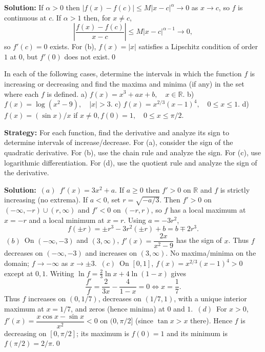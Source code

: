 \bigskip\noindent\textbf{Solution:}
If $\alpha>0$ then $|f(x)-f(c)|\le M|x-c|^{\alpha}\to 0$ as $x\to c$, so $f$ is continuous at $c$. If $\alpha>1$ then, for $x\ne c$,
\[\left|\frac{f(x)-f(c)}{x-c}\right|\le M|x-c|^{\alpha-1}\to 0,\]
so $f'(c)=0$ exists. For (b), $f(x)=|x|$ satisfies a Lipschitz condition of order $1$ at $0$, but $f'(0)$ does not exist.\qed


\begin{problembox}
In each of the following cases, determine the intervals in which the function \( f \) is increasing or decreasing and find the maxima and minima (if any) in the set where each \( f \) is defined.
a) \( f(x) = x^3 + ax + b, \quad x \in \mathbb{R} \).
b) \( f(x) = \log (x^2 - 9), \quad |x| > 3 \).
c) \( f(x) = x^{2/3}(x - 1)^4, \quad 0 \leq x \leq 1 \).
d) \( f(x) = (\sin x)/x \) if \( x \neq 0, f(0) = 1, \quad 0 \leq x \leq \pi /2 \).
\end{problembox}

\noindent\textbf{Strategy:} For each function, find the derivative and analyze its sign to determine intervals of increase/decrease. For (a), consider the sign of the quadratic derivative. For (b), use the chain rule and analyze the sign. For (c), use logarithmic differentiation. For (d), use the quotient rule and analyze the sign of the derivative.

\bigskip\noindent\textbf{Solution:}
\(\,(a)\,\) $f'(x)=3x^2+a$. If $a\ge 0$ then $f'>0$ on $\mathbb{R}$ and $f$ is strictly increasing (no extrema). If $a<0$, set $r=\sqrt{-a/3}$. Then $f'>0$ on $(-\infty,-r)\cup(r,\infty)$ and $f'<0$ on $(-r,r)$, so $f$ has a local maximum at $x=-r$ and a local minimum at $x=r$. Using $a=-3r^2$,
\[f(\pm r)=\pm r^3-3r^2(\pm r)+b=b\mp 2r^3.\]
\(\,(b)\,\) On $(-\infty,-3)$ and $(3,\infty)$, $f'(x)=\dfrac{2x}{x^2-9}$ has the sign of $x$. Thus $f$ decreases on $(-\infty,-3)$ and increases on $(3,\infty)$. No maxima/minima on the domain; $f\to-\infty$ as $x\to\pm3$.\newline
\(\,(c)\,\) On $[0,1]$, $f(x)=x^{2/3}(x-1)^4>0$ except at $0,1$. Writing $\ln f=\tfrac23\ln x+4\ln(1-x)$ gives
\[\frac{f'}{f}=\frac{2}{3x}-\frac{4}{1-x}=0\iff x=\frac17.\]
Thus $f$ increases on $(0,1/7)$, decreases on $(1/7,1)$, with a unique interior maximum at $x=1/7$, and zeros (hence minima) at $0$ and $1$.\newline
\(\,(d)\,\) For $x>0$, $f'(x)=\dfrac{x\cos x-\sin x}{x^2}<0$ on $(0,\pi/2]$ (since $\tan x> x$ there). Hence $f$ is decreasing on $[0,\pi/2]$; its maximum is $f(0)=1$ and its minimum is $f(\pi/2)=2/\pi$.\qed


